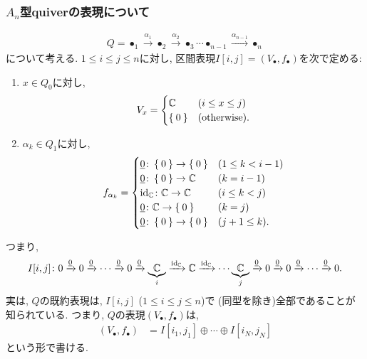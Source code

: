 \subsubsection{$A_n$型quiverの表現について}
\begin{align*}
Q=\bullet_1\xrightarrow{\alpha_1}\bullet_2\xrightarrow{\alpha_2}\bullet_3\cdots \bullet_{n-1}\xrightarrow{\alpha_{n-1}}\bullet_n
\end{align*}
について考える.
$1\leq i\leq j\leq n$に対し,
区間表現$I[i,j]=(V_\bullet,f_\bullet)$を次で定める:
\begin{enumerate}
\item
  $x\in Q_0$に対し,
  \begin{align*}
    V_x=
    \begin{cases}
      \mathbb{C} & (i\leq x \leq j)\\
      \Set{0} & (\text{otherwise}).
    \end{cases}
  \end{align*}
\item
  $\alpha_k\in Q_1$に対し,
  \begin{align*}
    f_{\alpha_k}=
    \begin{cases}
      \underline{0}\colon\Set{0} \to \Set{0} & (1\leq k < i-1)\\
      \underline{0}\colon\Set{0} \to \mathbb{C} & (k=i-1)\\
      \operatorname{id}_{\mathbb{C}}\colon\mathbb{C} \to \mathbb{C} & (i\leq k < j)\\
      \underline{0}\colon\mathbb{C} \to \Set{0} & (k=j)\\
      \underline{0}\colon\Set{0} \to \Set{0} & (j+1\leq k).
    \end{cases}
  \end{align*}  
\end{enumerate}
つまり,
\begin{align*}
  I[i,j]\colon
  0\xrightarrow{\underline{0}}
  0\xrightarrow{\underline{0}} \cdots \xrightarrow{\underline{0}}
  0\xrightarrow{\underline{0}}
  \underbrace{\mathbb{C}}_{i} \xrightarrow{\operatorname{id}_{\mathbb{C}}}
  \mathbb{C} \xrightarrow{\operatorname{id}_{\mathbb{C}}} \cdots
  \underbrace{\mathbb{C}}_{j} \xrightarrow{\underline{0}}
  0\xrightarrow{\underline{0}}
  0\xrightarrow{\underline{0}} \cdots \xrightarrow{\underline{0}}
  0.
\end{align*}
実は,
$Q$の既約表現は, $I[i,j]$ ($1\leq i\leq j \leq n$)で
(同型を除き)全部であることが知られている.
つまり, $Q$の表現$(V_\bullet,f_\bullet)$は,
\begin{align*}
  (V_\bullet,f_\bullet)
  &=I[i_1,j_1]\oplus\cdots\oplus I[i_N,j_N]
\end{align*}
という形で書ける.


